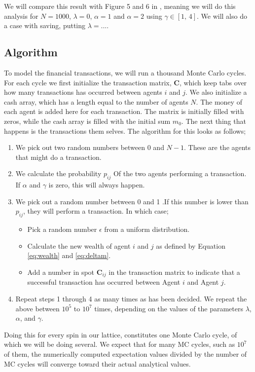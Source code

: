 \documentclass[a4paper,10pt,english]{article}
\begin{document}
We will compare this result with Figure 5 and 6 in \citet{Goswami}, meaning we will do this analysis for $N=1000$, $\lambda=0$, $\alpha=1$ and $\alpha=2$ using $\gamma\in[1,\,4]$. We will also do a case with saving, putting $\lambda=...$.

\subsection{Algorithm}
To model the financial transactions, we will run a thousand Monte Carlo cycles. For each cycle we first initialize the transaction matrix, \textbf{C}, which keep tabs over how many transactions has occurred between agents $i$ and $j$. We also initialize a cash array, which has a length equal to the number of agents $N$. The money of each agent is added here for each transaction. The matrix is initially filled with zeros, while the cash array is filled with the initial sum $m_0$. The next thing that happens is the transactions them selves. The algorithm for this looks as follows;
\begin{enumerate}
\item We pick out two random numbers between 0 and $N-1$. These are the agents that might do a transaction.
\item We calculate the probability $p_{ij}$ Of the two agents performing a transaction. If $\alpha$ and $\gamma$ is zero, this will always happen.
\item We pick out a random number between 0 and 1 .If this number is lower than $p_{ij}$, they will perform a transaction. In which case;
\begin{itemize}
\item Pick a random number $\epsilon$ from a uniform distribution.
\item Calculate the new wealth of agent $i$ and $j$ as defined by Equation \ref{eq:wealth} and \ref{eq:deltam}.
\item Add a number in spot $\textbf{C}_{ij}$ in the transaction matrix to indicate that a successful transaction has occurred between Agent $i$ and Agent $j$.

\end{itemize}
\item Repeat steps 1 through 4 as many times as has been decided. We repeat the above between $10^5$ to $10^7$ times, depending on the values of the parameters $\lambda$, $\alpha$, and $\gamma$. 
\end{enumerate}
Doing this for every spin in our lattice, constitutes one Monte Carlo cycle, of which we will be doing several. We expect that for many MC cycles, such as $10^7$ of them, the numerically computed expectation values divided by the number of MC cycles will converge toward their actual analytical values. 
\end{document}
